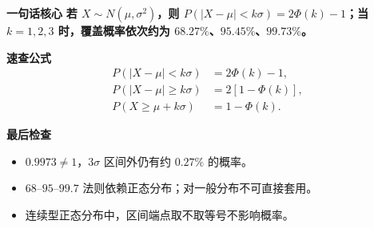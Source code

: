 \clearpage
\begin{summarybox}
	\textbf{\textcolor{CSummary}{一句话核心}}
	\textbf{若 $X\sim N(\mu,\sigma^2)$，则 $P(|X-\mu|<k\sigma)=2\Phi(k)-1$；当 $k=1,2,3$ 时，覆盖概率依次约为 $68.27\%$、$95.45\%$、$99.73\%$。}

	\medskip
	\textbf{\textcolor{CSummary}{速查公式}}
	\[
		\begin{aligned}
			P(|X-\mu|<k\sigma)&=2\Phi(k)-1,\\
			P(|X-\mu|\ge k\sigma)&=2[1-\Phi(k)],\\
			P(X\ge\mu+k\sigma)&=1-\Phi(k).
		\end{aligned}
	\]

	

	\medskip
	\textbf{\textcolor{CSummary}{最后检查}}
	\begin{itemize}[leftmargin=*, itemsep=0.45em, topsep=0.4em]
		\item $0.9973\ne1$，$3\sigma$ 区间外仍有约 $0.27\%$ 的概率。
		\item $68$--$95$--$99.7$ 法则依赖正态分布；对一般分布不可直接套用。
		\item 连续型正态分布中，区间端点取不取等号不影响概率。
	\end{itemize}
\end{summarybox}
